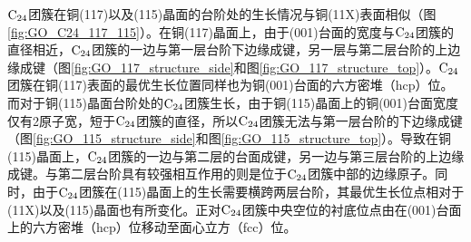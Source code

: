 $\rm{C_{24}}$团簇在铜(117)以及(115)晶面的台阶处的生长情况与铜(11X)表面相似（图\ref{fig:GO_C24_117_115}）。在铜(117)晶面上，由于(001)台面的宽度与$\rm{C_{24}}$团簇的直径相近，$\rm{C_{24}}$团簇的一边与第一层台阶下边缘成键，另一层与第二层台阶的上边缘成键（图\ref{fig:GO_117_structure_side}和图\ref{fig:GO_117_structure_top}）。$\rm{C_{24}}$团簇在铜(117)表面的最优生长位置同样也为铜(001)台面的六方密堆（hcp）位。而对于铜(115)晶面台阶处的$\rm{C_{24}}$团簇生长，由于铜(115)晶面上的铜(001)台面宽度仅有2原子宽，短于$\rm{C_{24}}$团簇的直径，所以$\rm{C_{24}}$团簇无法与第一层台阶的下边缘成键（图\ref{fig:GO_115_structure_side}和图\ref{fig:GO_115_structure_top}）。导致在铜(115)晶面上，$\rm{C_{24}}$团簇的一边与第二层的台面成键，另一边与第三层台阶的上边缘成键。与第二层台阶具有较强相互作用的则是位于$\rm{C_{24}}$团簇中部的边缘原子。同时，由于$\rm{C_{24}}$团簇在(115)晶面上的生长需要横跨两层台阶，其最优生长位点相对于(11X)以及(115)晶面也有所变化。正对$\rm{C_{24}}$团簇中央空位的衬底位点由在(001)台面上的六方密堆（hcp）位移动至面心立方（fcc）位。

